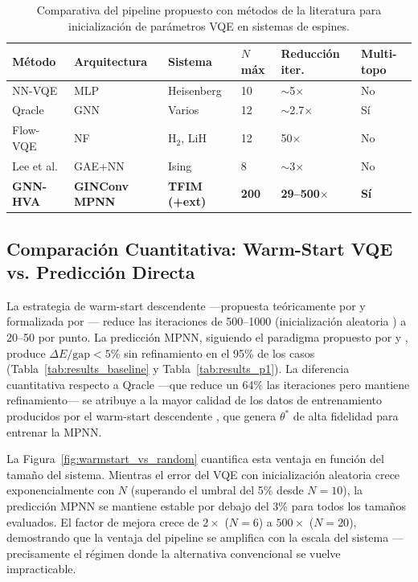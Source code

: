 \documentclass[11pt,a4paper,spanish]{book}
\begin{document}
\begin{table}[h]
\centering
\caption{Comparativa del pipeline propuesto con métodos de la literatura para inicialización de parámetros VQE en sistemas de espines.}
\label{tab:comparison_literature}
\begin{tabular}{p{2.5cm}p{2cm}p{2cm}p{2cm}p{2.5cm}p{2cm}}
\toprule
\textbf{Método} & \textbf{Arquitectura} & \textbf{Sistema} & \textbf{$N$ máx} & \textbf{Reducción iter.} & \textbf{Multi-topo} \\
\midrule
NN-VQE \citep{miao2024} & MLP & Heisenberg & 10 & $\sim$5$\times$ & No \\
Qracle \citep{zhang2025} & GNN & Varios & 12 & $\sim$2.7$\times$ & Sí \\
Flow-VQE \citep{zou2026} & NF & H$_2$, LiH & 12 & 50$\times$ & No \\
Lee et al. \citep{lee2026} & GAE+NN & Ising & 8 & $\sim$3$\times$ & No \\
\midrule
\textbf{GNN-HVA} & \textbf{GINConv MPNN} & \textbf{TFIM (+ext)} & \textbf{200} & \textbf{29--500$\times$} & \textbf{Sí} \\
\bottomrule
\end{tabular}
\end{table}

\subsection{Comparación Cuantitativa: Warm-Start VQE vs. Predicción Directa}

La estrategia de warm-start descendente ---propuesta teóricamente por \citet{mele2022} y formalizada por \citet{puig2025}--- reduce las iteraciones de 500--1000 (inicialización aleatoria \citep{tilly2022}) a 20--50 por punto. La predicción MPNN, siguiendo el paradigma propuesto por \citet{miao2024} y \citet{zhang2025}, produce $\Delta E/\text{gap} < 5\%$ sin refinamiento en el 95\% de los casos (Tabla~\ref{tab:results_baseline} y Tabla~\ref{tab:results_p1}). La diferencia cuantitativa respecto a Qracle \citep{zhang2025} ---que reduce un 64\% las iteraciones pero mantiene refinamiento--- se atribuye a la mayor calidad de los datos de entrenamiento producidos por el warm-start descendente \citep{puig2025, schiffer2026}, que genera $\theta^*$ de alta fidelidad para entrenar la MPNN.

La Figura~\ref{fig:warmstart_vs_random} cuantifica esta ventaja en función del tamaño del sistema. Mientras el error del VQE con inicialización aleatoria crece exponencialmente con $N$ (superando el umbral del 5\% desde $N = 10$), la predicción MPNN se mantiene estable por debajo del 3\% para todos los tamaños evaluados. El factor de mejora crece de $2\times$ ($N = 6$) a $500\times$ ($N = 20$), demostrando que la ventaja del pipeline se amplifica con la escala del sistema ---precisamente el régimen donde la alternativa convencional se vuelve impracticable.
\end{document}
